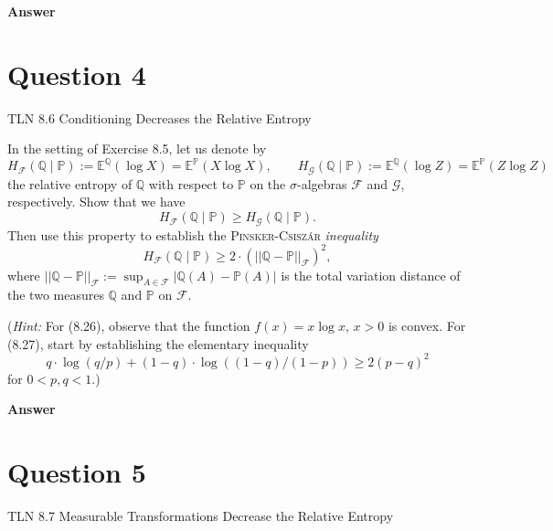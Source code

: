\documentclass[letterpaper]{article}
\begin{document}
		
		\textbf{Answer}
		
		\clearpage
		
		\section{Question 4}
		
		{\color{deepred} TLN 8.6 Conditioning Decreases the Relative Entropy} 
		
		In the setting of Exercise 8.5, let us denote by
		\[
		H_{\mathcal{F}}(\mathbb{Q} \mid \mathbb{P}) := \mathbb{E}^{\mathbb{Q}}(\log X) = \mathbb{E}^{\mathbb{P}}(X \log X), \qquad H_{\mathcal{G}}(\mathbb{Q} \mid \mathbb{P}) := \mathbb{E}^{\mathbb{Q}}(\log Z) = \mathbb{E}^{\mathbb{P}}(Z \log Z)
		\]
		the relative entropy of $\mathbb{Q}$ with respect to $\mathbb{P}$ on the $\sigma$-algebras $\mathcal{F}$ and $\mathcal{G}$, respectively. Show that we have
		\begin{equation}
			H_{\mathcal{F}}(\mathbb{Q} \mid \mathbb{P}) \geq H_{\mathcal{G}}(\mathbb{Q} \mid \mathbb{P}). \tag{8.26}
		\end{equation}
		Then use this property to establish the \textsc{Pinsker-Csisz\'{a}r} \textit{inequality}
		\begin{equation}
			H_{\mathcal{F}}(\mathbb{Q} \mid \mathbb{P}) \geq 2 \cdot \left(||\mathbb{Q} - \mathbb{P}||_{\mathcal{F}}\right)^2, \tag{8.27}
		\end{equation}
		where $||\mathbb{Q} - \mathbb{P}||_{\mathcal{F}} := \sup_{A \in \mathcal{F}} |\mathbb{Q}(A) - \mathbb{P}(A)|$ is the total variation distance of the two measures $\mathbb{Q}$ and $\mathbb{P}$ on $\mathcal{F}$.
		
		(\textit{Hint:} For (8.26), observe that the function $f(x) = x \log x$, $x > 0$ is convex. For (8.27), start by establishing the elementary inequality
		\[
		q \cdot \log(q/p) + (1-q) \cdot \log\!\left((1-q)/(1-p)\right) \geq 2(p-q)^2
		\]
		for $0 < p, q < 1$.)
		
		
		\textbf{Answer}
		
		\clearpage
		
		\section{Question 5}
		
		{\color{deepred} TLN 8.7 Measurable Transformations Decrease the Relative Entropy} 
		
\end{document}
